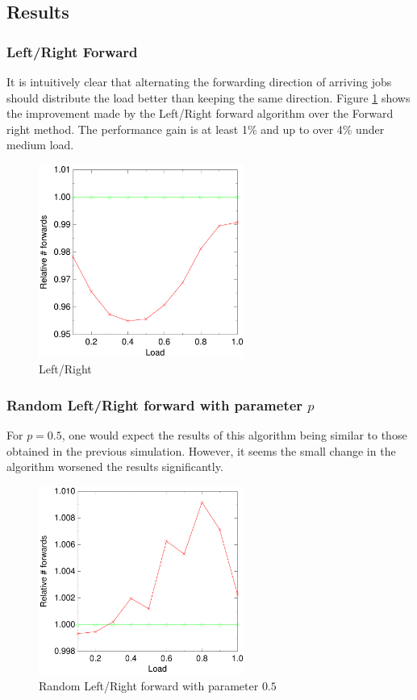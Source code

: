 \documentclass[10pt,a4paper]{article}
\begin{document}
\subsection{Results}

\subsubsection*{Left/Right Forward}
It is intuitively clear that alternating the forwarding direction of arriving jobs should distribute the load better than keeping the same direction. Figure \ref{figlr} shows the improvement made by the Left/Right forward algorithm over the Forward right method. The performance gain is at least 1\% and up to over 4\% under medium load.

\begin{figure}[h!tb]
\centering
\includegraphics[width=0.6\textwidth]{data/switchright.pdf}
\caption{Left/Right}
\label{figlr}
\end{figure}


\subsubsection*{Random Left/Right forward with parameter $p$}
For $p=0.5$, one would expect the results of this algorithm being similar to those obtained in the previous simulation. However, it seems the small change in the algorithm worsened the results significantly.

\begin{figure}[h!tb]
\centering
\includegraphics[width=0.6\textwidth]{data/randswitchright.pdf}
\caption{Random Left/Right forward with parameter $0.5$}
\label{figrandswitch}
\end{figure}
\end{document}
